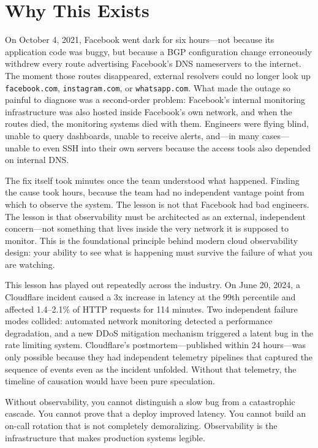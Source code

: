 \documentclass[11pt,a4paper]{article}
\begin{document}
\section{Why This Exists}

On October 4, 2021, Facebook went dark for six hours---not because its application code was buggy, but because a BGP configuration change erroneously withdrew every route advertising Facebook's DNS nameservers to the internet. The moment those routes disappeared, external resolvers could no longer look up \texttt{facebook.com}, \texttt{instagram.com}, or \texttt{whatsapp.com}. What made the outage so painful to diagnose was a second-order problem: Facebook's internal monitoring infrastructure was also hosted inside Facebook's own network, and when the routes died, the monitoring systems died with them. Engineers were flying blind, unable to query dashboards, unable to receive alerts, and---in many cases---unable to even SSH into their own servers because the access tools also depended on internal DNS.

The fix itself took minutes once the team understood what happened. Finding the cause took hours, because the team had no independent vantage point from which to observe the system. The lesson is not that Facebook had bad engineers. The lesson is that observability must be architected as an external, independent concern---not something that lives inside the very network it is supposed to monitor. This is the foundational principle behind modern cloud observability design: your ability to see what is happening must survive the failure of what you are watching.

This lesson has played out repeatedly across the industry. On June 20, 2024, a Cloudflare incident caused a 3x increase in latency at the 99th percentile and affected 1.4--2.1\% of HTTP requests for 114 minutes. Two independent failure modes collided: automated network monitoring detected a performance degradation, and a new DDoS mitigation mechanism triggered a latent bug in the rate limiting system. Cloudflare's postmortem---published within 24 hours---was only possible because they had independent telemetry pipelines that captured the sequence of events even as the incident unfolded. Without that telemetry, the timeline of causation would have been pure speculation.

Without observability, you cannot distinguish a slow bug from a catastrophic cascade. You cannot prove that a deploy improved latency. You cannot build an on-call rotation that is not completely demoralizing. Observability is the infrastructure that makes production systems legible.
\end{document}
